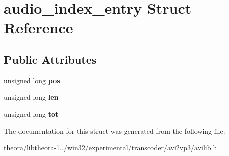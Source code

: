 \hypertarget{structaudio__index__entry}{\section{audio\+\_\+index\+\_\+entry Struct Reference}
\label{structaudio__index__entry}
}
\subsection*{Public Attributes}
\begin{DoxyCompactItemize}
\item 
\hypertarget{structaudio__index__entry_a0d25b7c1d59090db82ad094ebd1574a4}{unsigned long {\bfseries pos}}\label{structaudio__index__entry_a0d25b7c1d59090db82ad094ebd1574a4}

\item 
\hypertarget{structaudio__index__entry_add501719ed63b5572178044295f3c883}{unsigned long {\bfseries len}}\label{structaudio__index__entry_add501719ed63b5572178044295f3c883}

\item 
\hypertarget{structaudio__index__entry_a5b5a1ee6c6a376c35a3704aa1a4a2740}{unsigned long {\bfseries tot}}\label{structaudio__index__entry_a5b5a1ee6c6a376c35a3704aa1a4a2740}

\end{DoxyCompactItemize}


The documentation for this struct was generated from the following file\+:\begin{DoxyCompactItemize}
\item 
theora/libtheora-\/1../win32/experimental/transcoder/avi2vp3/avilib.\+h\end{DoxyCompactItemize}
